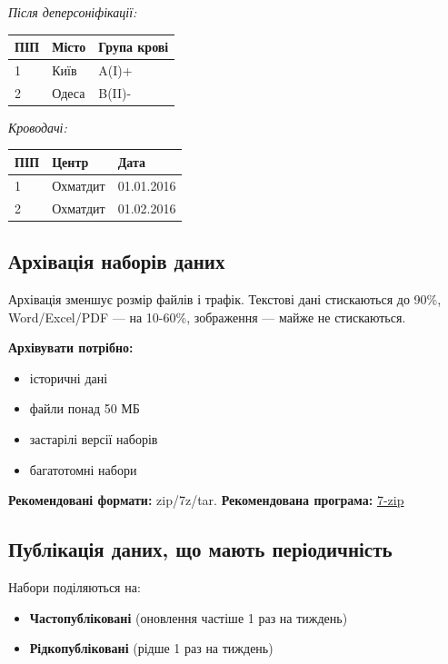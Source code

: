 \textit{Після деперсоніфікації:}

\begin{tabular}{|l|l|l|}
\hline
ПІП & Місто & Група крові \\
\hline
1   & Київ  & A(I)+       \\
2   & Одеса & B(II)-      \\
\hline
\end{tabular}

\textit{Кроводачі:}

\begin{tabular}{|l|l|l|}
\hline
ПІП & Центр    & Дата       \\
\hline
1   & Охматдит & 01.01.2016 \\
2   & Охматдит & 01.02.2016 \\
\hline
\end{tabular}

\subsection{Архівація наборів даних}

Архівація зменшує розмір файлів і трафік. Текстові дані стискаються до 90\%, Word/Excel/PDF — на 10-60\%, зображення — майже не стискаються.

\textbf{Архівувати потрібно:}

\begin{itemize}
    \item історичні дані
    \item файли понад 50 МБ
    \item застарілі версії наборів
    \item багатотомні набори
\end{itemize}

\textbf{Рекомендовані формати:} zip/7z/tar.  
\textbf{Рекомендована програма:} \href{http://7-zip.org.ua/}{7-zip}

\subsection{Публікація даних, що мають періодичність}

Набори поділяються на:

\begin{itemize}
    \item \textbf{Частопубліковані} (оновлення частіше 1 раз на тиждень)
    \item \textbf{Рідкопубліковані} (рідше 1 раз на тиждень)
\end{itemize}

